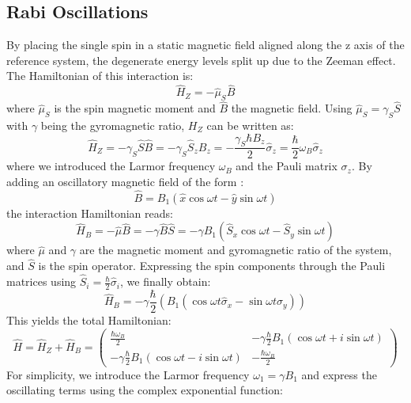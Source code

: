 \documentclass[12pt,a4paper]{article}
\begin{document}
\subsection{Rabi Oscillations}\label{rabi}
By placing the single spin in a static magnetic field aligned along the z axis of the reference system, the degenerate energy levels split up due to the Zeeman effect. The Hamiltonian of this interaction is:
\begin{equation}
\hat{H}_Z=-\hat{\mu}_S\hat{B}
\end{equation}
where $\hat{\mu}_S$ is the spin magnetic moment and $\hat{B}$ the magnetic field. Using $\hat{\mu}_S=\gamma_S\hat{S}$ with $\gamma$ being the gyromagnetic ratio, $H_Z$ can be written as:
\begin{equation}\label{hz}
\hat{H}_Z=-\gamma_S\hat{S}\hat{B}=-\gamma_S\hat{S}_zB_z=-\frac{\gamma_S\hbar B_z}{2}\hat{\sigma}_z=\frac{\hbar}{2}\omega_B\hat{\sigma}_z
\end{equation}
where we introduced the Larmor frequency $\omega_{B}$ and the Pauli matrix $\sigma_z$. By adding an oscillatory magnetic field of the form \cite{bel}:
\begin{equation}
\hat{B}=B_1(\hat{x}\cos\omega t-\hat{y}\sin\omega t)
\end{equation}
the interaction Hamiltonian reads:
\begin{equation}
\hat{H}_B=-\hat{\mu}\hat{B}=-\gamma\hat{B}\hat{S}=-\gamma B_1(\hat{S}_x\cos\omega t-\hat{S}_y\sin\omega t)
\end{equation}
where $\hat{\mu}$ and $\gamma$ are the magnetic moment and gyromagnetic ratio of the system, and $\hat{S}$ is the spin operator. 
Expressing the spin components through the Pauli matrices using $\hat{S}_i=\frac{\hbar}{2}\hat{\sigma}_i$, we finally obtain:
\begin{equation}
\hat{H}_B=-\gamma\frac{\hbar}{2}\left(B_1(\cos\omega t\hat{\sigma}_x-\sin\omega t\hat{\sigma}_y)\right)
\end{equation}
This yields the total Hamiltonian:
\begin{equation}
\hat{H}=\hat{H}_Z+\hat{H}_B=\left(\begin{matrix}
\frac{\hbar\omega_{B}}{2}&-\gamma\frac{\hbar}{2}B_1(\cos\omega t+i\sin\omega t)\\
-\gamma\frac{\hbar}{2}B_1(\cos\omega t-i\sin\omega t)&-\frac{\hbar\omega_ {B}}{2}
\end{matrix}\right)
\end{equation}
For simplicity, we introduce the Larmor frequency $\omega_1 =\gamma B_1$ and express the oscillating terms using the complex exponential function:
\end{document}
